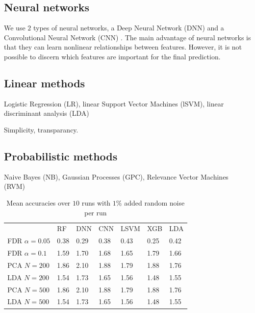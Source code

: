 \documentclass[a4paper,10pt]{article}
\begin{document}
\subsection{Neural networks}

We use $2$ types of neural networks, a Deep Neural Network (DNN) \cite{lecun2015deep} and a Convolutional Neural Network (CNN) \cite{Lecun98}. The main advantage of neural networks is that they can learn nonlinear relationships between features. However, it is not possible to discern which features are important for the final prediction. 

\subsection{Linear methods}

Logistic Regression (LR), linear Support Vector Machines (lSVM), linear discriminant analysis (LDA)

Simplicity, transparancy.

\subsection{Probabilistic methods}
%
Naive Bayes (NB), Gaussian Processes (GPC), Relevance Vector Machines (RVM)


% 
\begin{table}[htp]
\centering
\caption{Mean accuracies over $10$ runs with $1\%$ added random noise per run}
\label{tab:diversitymetrics}
\begin{tabular}{lllllll}
				& RF     & DNN 		& CNN  		& LSVM 		& 	XGB 	& 	LDA  \\
FDR $\alpha=0.05$		& 0.38   &  0.29      	&  0.38     	&  0.43    	& 0.25    	& 0.42  \\
FDR $\alpha=0.1$ 		& 1.59   &  1.70      	&  1.68 	&  1.65    	& 1.79    	& 1.66  \\
PCA $N=200$    			& 1.86   &  2.10      	&  1.88         &  1.79    	& 1.88          & 1.76  \\
LDA $N=200$        		& 1.54   &  1.73      	&  1.65         &  1.56    	& 1.48          & 1.55  \\
PCA $N=500$    			& 1.86   &  2.10      	&  1.88         &  1.79    	& 1.88          & 1.76  \\
LDA $N=500$        		& 1.54   &  1.73      	&  1.65         &  1.56    	& 1.48          & 1.55  \\
\end{tabular}
\end{table}
%
\end{document}
